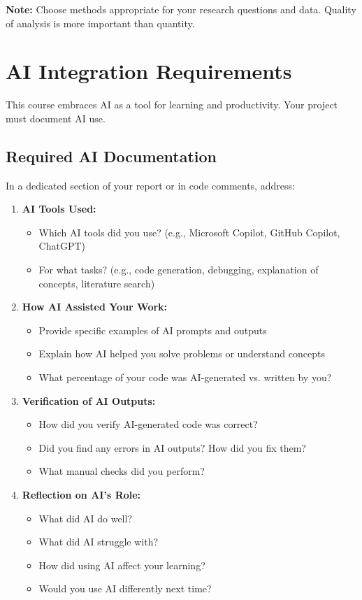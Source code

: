 \documentclass[11pt]{article}
\begin{document}
\textbf{Note:} Choose methods appropriate for your research questions and data. Quality of analysis is more important than quantity.

\section{AI Integration Requirements}

This course embraces AI as a tool for learning and productivity. Your project must document AI use.

\subsection{Required AI Documentation}

In a dedicated section of your report or in code comments, address:

\begin{enumerate}
\item \textbf{AI Tools Used:}
  \begin{itemize}
  \item Which AI tools did you use? (e.g., Microsoft Copilot, GitHub Copilot, ChatGPT)
  \item For what tasks? (e.g., code generation, debugging, explanation of concepts, literature search)
  \end{itemize}

\item \textbf{How AI Assisted Your Work:}
  \begin{itemize}
  \item Provide specific examples of AI prompts and outputs
  \item Explain how AI helped you solve problems or understand concepts
  \item What percentage of your code was AI-generated vs. written by you?
  \end{itemize}

\item \textbf{Verification of AI Outputs:}
  \begin{itemize}
  \item How did you verify AI-generated code was correct?
  \item Did you find any errors in AI outputs? How did you fix them?
  \item What manual checks did you perform?
  \end{itemize}

\item \textbf{Reflection on AI's Role:}
  \begin{itemize}
  \item What did AI do well?
  \item What did AI struggle with?
  \item How did using AI affect your learning?
  \item Would you use AI differently next time?
  \end{itemize}
\end{enumerate}
\end{document}
